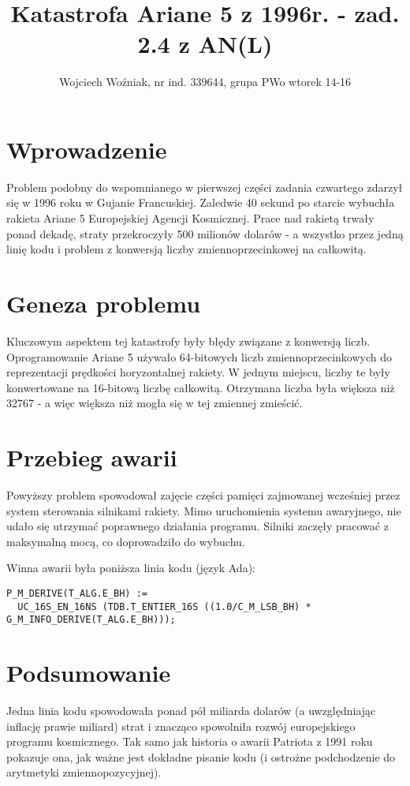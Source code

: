 \documentclass{article}
\begin{document}
\title{Katastrofa Ariane 5 z 1996r. - zad. 2.4 z AN(L)}
\author{Wojciech Woźniak, nr ind. 339644, grupa PWo wtorek 14-16}
\date{}

\maketitle

\section*{Wprowadzenie}
Problem podobny do wspomnianego w pierwszej części zadania czwartego zdarzył się w 1996 roku w Gujanie Francuskiej. Zaledwie 40 sekund po starcie wybuchła rakieta Ariane 5 Europejskiej Agencji Kosmicznej. Prace nad rakietą trwały ponad dekadę, straty przekroczyły 500 milionów dolarów - a wszystko przez jedną linię kodu i problem z konwersją liczby zmiennoprzecinkowej na całkowitą.


\section*{Geneza problemu}
Kluczowym aspektem tej katastrofy były błędy związane z konwersją liczb. Oprogramowanie Ariane 5 używało 64-bitowych liczb zmiennoprzecinkowych do reprezentacji prędkości horyzontalnej rakiety. W jednym miejscu, liczby te były konwertowane na 16-bitową liczbę całkowitą. Otrzymana liczba była większa niż 32767 - a więc większa niż mogła się w tej zmiennej zmieścić.

\section*{Przebieg awarii}
Powyższy problem spowodował zajęcie części pamięci zajmowanej wcześniej przez system sterowania silnikami rakiety. Mimo uruchomienia systemu awaryjnego, nie udało się utrzymać poprawnego działania programu. Silniki zaczęły pracować z maksymalną mocą, co doprowadziło do wybuchu.


Winna awarii była poniższa linia kodu (język Ada):
\begin{verbatim}
P_M_DERIVE(T_ALG.E_BH) := 
  UC_16S_EN_16NS (TDB.T_ENTIER_16S ((1.0/C_M_LSB_BH) * G_M_INFO_DERIVE(T_ALG.E_BH)));
\end{verbatim}

\section*{Podsumowanie}

Jedna linia kodu spowodowała ponad pół miliarda dolarów (a uwzględniając inflację prawie miliard) strat i znacząco spowolniła rozwój europejskiego programu kosmicznego. Tak samo jak historia o awarii Patriota z 1991 roku pokazuje ona, jak ważne jest dokładne pisanie kodu (i ostrożne podchodzenie do arytmetyki zmiennopozycyjnej).
\end{document}
